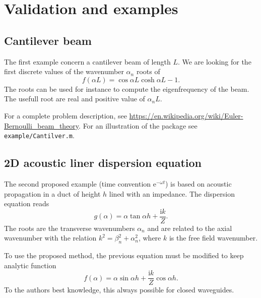 \documentclass[a4paper,10pt]{article}
\renewcommand{\i}{\mathrm{i}}
\begin{document}
\section{Validation and examples}


\subsection{Cantilever beam}
The first example concern a cantilever beam of length $L$. We are looking for the first discrete values of the wavenumber $\alpha_n$ roots of 
\begin{equation}
f(\alpha L) = \cos \alpha L \cosh \alpha L -1.
\end{equation}
The roots can be used for instance to compute the eigenfrequency of the beam. The usefull root are real and positive value of $\alpha_n L$.

For a complete problem description, see \url{https://en.wikipedia.org/wiki/Euler-Bernoulli_beam_theory}. For an illustration of the package see \texttt{example/Cantilver.m}.

\subsection{2D acoustic liner dispersion equation}
The second proposed example (time convention $\mathrm{e}^{-\omega t}$) is based on acoustic propagation in a duct of height $h$ lined with an impedance. The dispersion equation reads
\begin{equation}
	g(\alpha) = \alpha \tan \alpha h + \frac{\i k}{Z}.
\end{equation}
The roots are the transverse wavenumbers $\alpha_n$ and are related to the axial wavenumber with the relation $k^2 = \beta_n^2 + \alpha_n^2$, where $k$ is the free field wavenumber.

To use the proposed method, the previous equation must be modified to keep analytic function 
\begin{equation}
	f(\alpha) = \alpha \sin \alpha h + \frac{\i k}{Z} \cos \alpha h.
\end{equation}
To the authors best knowledge, this always possible for closed waveguides.
\end{document}
